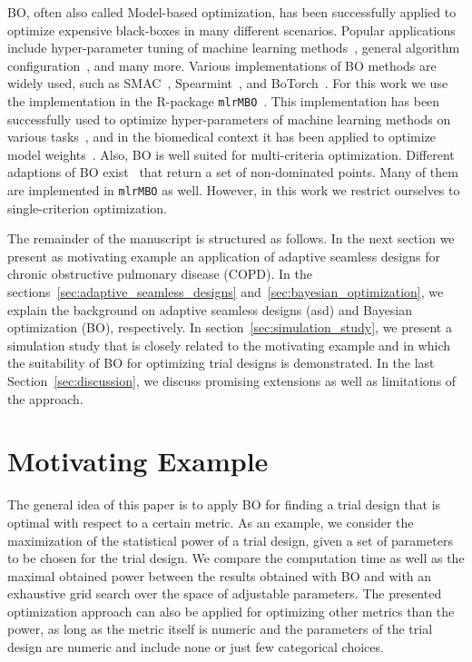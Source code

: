 \documentclass[bimj,fleqn]{w-art}
\theoremstyle{plain}
\theoremstyle{definition}
\begin{document}
BO, often also called Model-based optimization, has been successfully applied to optimize expensive black-boxes in many different scenarios.
Popular applications include hyper-parameter tuning of machine learning methods~\citep{snoek_practical_2012}, general algorithm configuration~\citep{hutter_sequential_2011}, and many more.
Various implementations of BO methods are widely used, such as SMAC~\citep{hutter_sequential_2011}, Spearmint~\citep{snoek_practical_2012}, and BoTorch~\citep{balandat_botorch_2020}.
For this work we use the implementation in the R-package \texttt{mlrMBO}~\citep{bischl_mlrmbo_2017}.
This implementation has been successfully used to optimize hyper-parameters of machine learning methods on various tasks~\citep{bischl_mlrmbo_2017, wozniak_candle_2018}, and in the biomedical context it has been applied to optimize model weights~\citep{richter_modelbased_2019,browaeys_nichenet_2020}.
Also, BO is well suited for multi-criteria optimization.
Different adaptions of BO exist~\citep{horn_modelbased_2015} that return a set of non-dominated points.
Many of them are implemented in \texttt{mlrMBO} as well.
However, in this work we restrict ourselves to single-criterion optimization. 

The remainder of the manuscript is structured as follows.
In the next section we present as motivating example an application of adaptive seamless designs for chronic obstructive pulmonary disease (COPD).
In the sections~\ref{sec:adaptive_seamless_designs} and~\ref{sec:bayesian_optimization}, we explain the background on adaptive seamless designs (asd) and Bayesian optimization (BO), respectively.
In section~\ref{sec:simulation_study}, we present a simulation study that is closely related to the motivating example and in which the suitability of BO for optimizing trial designs is demonstrated.
In the last Section~\ref{sec:discussion}, we discuss promising extensions as well as limitations of the approach.

\section{Motivating Example}
\label{sec:motivating_example}

The general idea of this paper is to apply BO for finding a trial design that is optimal with respect to a certain metric.
As an example, we consider the maximization of the statistical power of a trial design, given a set of parameters to be chosen for the trial design.
We compare the computation time as well as the maximal obtained power between the results obtained with BO and with an exhaustive grid search over the space of adjustable parameters.
The presented optimization approach can also be applied for optimizing other metrics than the power, as long as the metric itself is numeric and the parameters of the trial design are numeric and include none or just few categorical choices.
\end{document}
